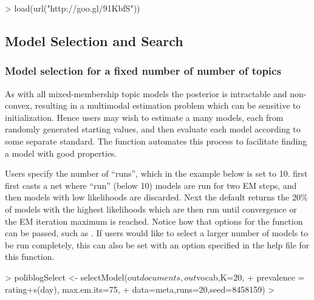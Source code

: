 \documentclass[nojss]{jss}
\begin{document}
\begin{Schunk}
\begin{Sinput}
>  load(url("http://goo.gl/91KbfS"))
\end{Sinput}
\end{Schunk}

\subsection{Model Selection and Search}

\subsubsection{Model selection for a fixed number of number of topics}
As with all mixed-membership topic models the posterior is intractable and non-convex, resulting in a multimodal estimation problem which can be sensitive to initialization. Hence users may wish to estimate a many models, each from randomly generated starting values, and then evaluate each model according to some separate standard. The function  automates this process to facilitate finding a model with good properties.

Users specify the number of ``runs'', which in the example below is set to 10.  first first casts a net where ``run'' (below 10) models are run for two EM steps, and then models with low likelihoods are discarded. Next the default returns the 20\% of models with the highest likelihoods which are then run until convergence or the EM iteration maximum is reached. Notice how that options for the  function can be passed, such as . If users would like to select a larger number of models to be run completely, this can also be set with an option specified in the help file for this function.

\begin{Schunk}
\begin{Sinput}
> poliblogSelect <- selectModel(out$documents,out$vocab,K=20,
+         prevalence =~ rating+s(day), max.em.its=75,
+         data=meta,runs=20,seed=8458159)
> 
\end{Sinput}
\end{Schunk}
\end{document}
